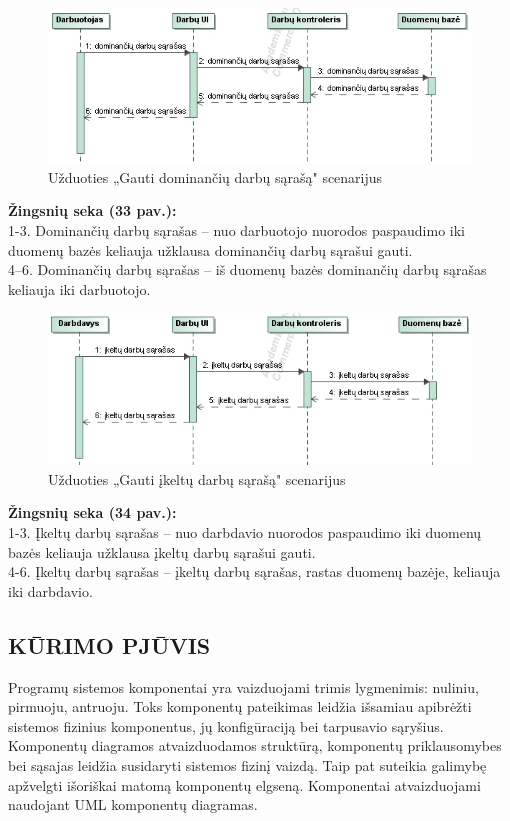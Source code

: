 \documentclass{VUMIFPSkursinis}
\begin{document}
\begin{figure}[H]
\centering
\includegraphics[width=\linewidth, frame]{img/seku(dominantys).png}
\caption{Užduoties „Gauti dominančių darbų sąrašą" scenarijus}
\end{figure}
	\textbf{Žingsnių seka (33 pav.):}\\
	1-3. Dominančių darbų sąrašas – nuo darbuotojo nuorodos paspaudimo iki duomenų bazės keliauja užklausa dominančių darbų sąrašui gauti.\\
	4–6. Dominančių darbų sąrašas – iš duomenų bazės dominančių darbų sąrašas keliauja iki darbuotojo.\\
\begin{figure}[H]
\centering
\includegraphics[width=\linewidth, frame]{img/seku(ikelti).png}
\caption{Užduoties „Gauti įkeltų darbų sąrašą" scenarijus}
\end{figure}
	\textbf{Žingsnių seka (34 pav.):}\\
	1-3. Įkeltų darbų sąrašas – nuo darbdavio nuorodos paspaudimo iki duomenų bazės keliauja užklausa įkeltų darbų sąrašui gauti.\\
	4-6. Įkeltų darbų sąrašas – įkeltų darbų sąrašas, rastas duomenų bazėje, keliauja iki darbdavio.\\
\newpage
\subsection{KŪRIMO PJŪVIS}
Programų sistemos komponentai yra vaizduojami trimis lygmenimis: nuliniu, pirmuoju, antruoju. Toks komponentų pateikimas leidžia išsamiau apibrėžti sistemos fizinius komponentus, jų konfigūraciją bei tarpusavio sąryšius. Komponentų diagramos atvaizduodamos struktūrą, komponentų priklausomybes bei sąsajas leidžia susidaryti sistemos fizinį vaizdą. Taip pat suteikia galimybę apžvelgti išoriškai matomą komponentų elgseną. Komponentai atvaizduojami naudojant UML komponentų diagramas.
\end{document}
